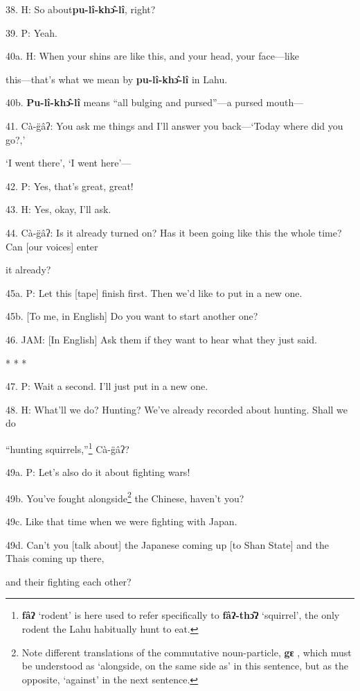 38. H: So about\textbf{pu-lî-khɔ̂-lî}, right?

39. P: Yeah.

40a. H:  When your shins are like
this, and your head, your face---like

this---that's what we mean by \textbf{pu-lî-khɔ̂-lî} in Lahu.


40b. \textbf{Pu-lî-khɔ̂-lî} means ``all bulging and pursed''---a pursed mouth---

41. Cà-g̈âʔ: You ask me things and I'll answer you back---`Today where did
you go?,'

`I went there', `I went here'---

42. P: Yes, that's great, great!

43. H: Yes, okay, I'll ask.

44. Cà-g̈âʔ: Is it already turned on? Has it been going like this the whole
time? Can [our voices] enter

it already?

45a. P: Let this [tape] finish first. Then we'd like to put in a new one.

45b. [To me, in English] Do you want to start another one?

46. JAM: [In English] Ask them if they want to hear what they just said.

* * *

47. P: Wait a second. I'll just put in a new one.

48. H: What'll we do? Hunting? We've already recorded about hunting. Shall we do


``hunting squirrels,''\footnote{\textbf{fâʔ} `rodent' is here used to refer specifically to \textbf{fâʔ-thɔ̂ʔ} `squirrel', the only rodent the Lahu habitually hunt to eat.} Cà-g̈âʔ?

49a. P: Let's also do it about fighting wars!

49b. You've fought alongside\footnote{Note different translations of the commutative noun-particle, \textbf{gɛ} , which must be understood as `alongside, on the same side as' in this sentence, but as the opposite, `against' in the next sentence.} the Chinese, haven't you?

49c. Like that time when we were fighting with Japan.

49d. Can't you [talk about] the Japanese coming up [to Shan State] and the Thais
coming up there,

and their fighting each other?

